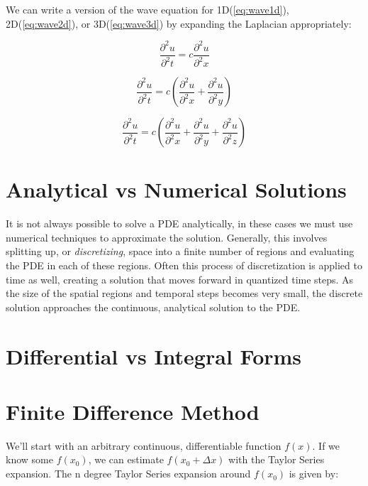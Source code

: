 { We can write a version of the wave equation for 1D(\ref{eq:wave1d}), 2D(\ref{eq:wave2d}), or 3D(\ref{eq:wave3d}) by expanding the Laplacian appropriately:
 
 \begin{equation}\label{eq:wave1d}
  \frac{\partial^{2}u}{\partial^{2}t} = c\frac{\partial^{2}u}{\partial^{2}x}
  \end{equation}
  
   \begin{equation}\label{eq:wave2d}
  \frac{\partial^{2}u}{\partial^{2}t} = c\left(\frac{\partial^{2}u}{\partial^{2}x}+\frac{\partial^{2}u}{\partial^{2}y}\right)
  \end{equation}
  
   \begin{equation}\label{eq:wave3d}
  \frac{\partial^{2}u}{ \partial^{2}t} = c\left(\frac{\partial^{2}u}{\partial^{2}x}+\frac{\partial^{2}u}{\partial^{2}y}+\frac{\partial^{2}u}{\partial^{2}z} \right)
  \end{equation}
 
\section{Analytical vs Numerical Solutions}

It is not always possible to solve a PDE analytically, in these cases we must use numerical techniques to approximate the solution.  Generally, this involves splitting up, or \textit{discretizing}, space into a finite number of regions and evaluating the PDE in each of these regions.  Often this process of discretization is applied to time as well, creating a solution that moves forward in quantized time steps.  As the size of the spatial regions and temporal steps becomes very small, the discrete solution approaches the continuous, analytical solution to the PDE.

\section{Differential vs Integral Forms}

\section{Finite Difference Method}

We'll start with an arbitrary continuous, differentiable function $f(x)$.  If we know some $f(x_{0})$, we can estimate $f(x_{0}+\Delta  x)$ with the Taylor Series expansion.  The n degree Taylor Series expansion around $f(x_{0})$ is given by:

}
